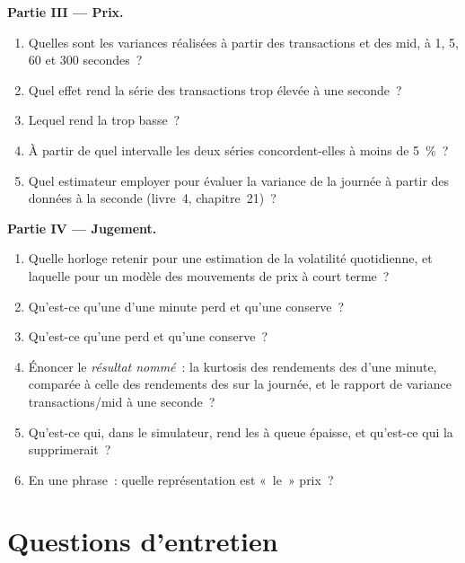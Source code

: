 \begin{problem}
\medskip\noindent\textbf{Partie III --- Prix.}
\begin{enumerate}[resume]
\item Quelles sont les variances réalisées à partir des transactions et des mid, à 1, 5, 60 et 300 secondes~?
\item Quel effet rend la série des transactions trop élevée à une seconde~?
\item Lequel rend la  trop basse~?
\item À partir de quel intervalle les deux séries concordent-elles à moins de 5~\%~?
\item Quel estimateur employer pour évaluer la variance de la journée à partir des données à la seconde (livre~4, chapitre~21)~?
\end{enumerate}

\medskip\noindent\textbf{Partie IV --- Jugement.}
\begin{enumerate}[resume]
\item Quelle horloge retenir pour une estimation de la volatilité quotidienne, et laquelle pour un modèle des mouvements de prix à court terme~?
\item Qu'est-ce qu'une  d'une minute perd et qu'une  conserve~?
\item Qu'est-ce qu'une  perd et qu'une  conserve~?
\item Énoncer le \emph{résultat nommé}~: la kurtosis des rendements des  d'une minute, comparée à celle des rendements des  sur la journée, et le
rapport de variance transactions/mid à une seconde~?
\item Qu'est-ce qui, dans le simulateur, rend les  à queue épaisse, et qu'est-ce qui la supprimerait~?
\item En une phrase~: quelle représentation est «~le~» prix~?
\end{enumerate}
\end{problem}

\section{Questions d'entretien}

